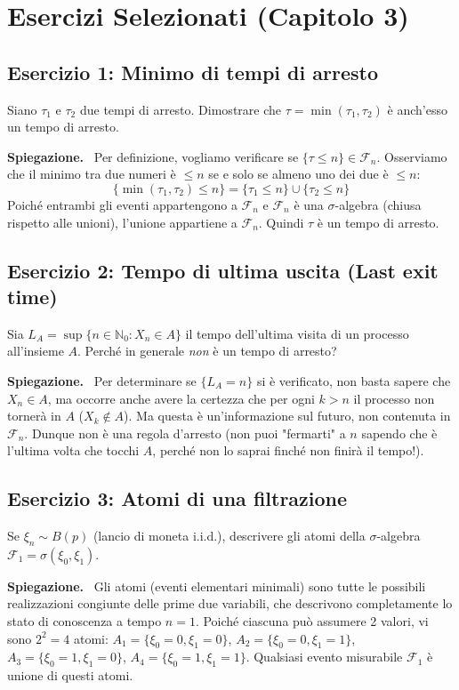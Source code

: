 \documentclass[11pt, a4paper]{report}
\theoremstyle{plain}
\theoremstyle{definition}
\theoremstyle{remark}
\newenvironment{spiegazione}[1][Spiegazione]
{\begin{mdframed}[backgroundcolor=green!5, linecolor=green!50, linewidth=2pt, topline=false, rightline=false, bottomline=false]
\textbf{\textsf{#1.}}\ }
{\end{mdframed}}
\newcommand{\F}{\mathcal{F}}
\newcommand{\N}{\mathbb{N}}
\newcommand{\1}{\mathbf{1}}
\begin{document}
\section{Esercizi Selezionati (Capitolo 3)}

\subsection*{Esercizio 1: Minimo di tempi di arresto}
Siano $\tau_1$ e $\tau_2$ due tempi di arresto. Dimostrare che $\tau = \min(\tau_1, \tau_2)$ è anch'esso un tempo di arresto.
\begin{spiegazione}
Per definizione, vogliamo verificare se $\{\tau \le n\} \in \F_n$. Osserviamo che il minimo tra due numeri è $\le n$ se e solo se almeno uno dei due è $\le n$:
\[ \{\min(\tau_1, \tau_2) \le n\} = \{\tau_1 \le n\} \cup \{\tau_2 \le n\} \]
Poiché entrambi gli eventi appartengono a $\F_n$ e $\F_n$ è una $\sigma$-algebra (chiusa rispetto alle unioni), l'unione appartiene a $\F_n$. Quindi $\tau$ è un tempo di arresto.
\end{spiegazione}

\subsection*{Esercizio 2: Tempo di ultima uscita (Last exit time)}
Sia $L_A = \sup\{n \in \N_0 : X_n \in A\}$ il tempo dell'ultima visita di un processo all'insieme $A$. Perché in generale \emph{non} è un tempo di arresto?
\begin{spiegazione}
Per determinare se $\{L_A = n\}$ si è verificato, non basta sapere che $X_n \in A$, ma occorre anche avere la certezza che per ogni $k > n$ il processo non tornerà in $A$ ($X_k \notin A$). Ma questa è un'informazione sul futuro, non contenuta in $\F_n$. Dunque non è una regola d'arresto (non puoi "fermarti" a $n$ sapendo che è l'ultima volta che tocchi $A$, perché non lo saprai finché non finirà il tempo!).
\end{spiegazione}

\subsection*{Esercizio 3: Atomi di una filtrazione}
Se $\xi_n \sim B(p)$ (lancio di moneta i.i.d.), descrivere gli atomi della $\sigma$-algebra $\F_1 = \sigma(\xi_0, \xi_1)$.
\begin{spiegazione}
Gli atomi (eventi elementari minimali) sono tutte le possibili realizzazioni congiunte delle prime due variabili, che descrivono completamente lo stato di conoscenza a tempo $n=1$. Poiché ciascuna può assumere 2 valori, vi sono $2^2 = 4$ atomi:
$A_1 = \{\xi_0=0, \xi_1=0\}$, $A_2 = \{\xi_0=0, \xi_1=1\}$, $A_3 = \{\xi_0=1, \xi_1=0\}$, $A_4 = \{\xi_0=1, \xi_1=1\}$.
Qualsiasi evento misurabile $\F_1$ è unione di questi atomi.
\end{spiegazione}
\end{document}
